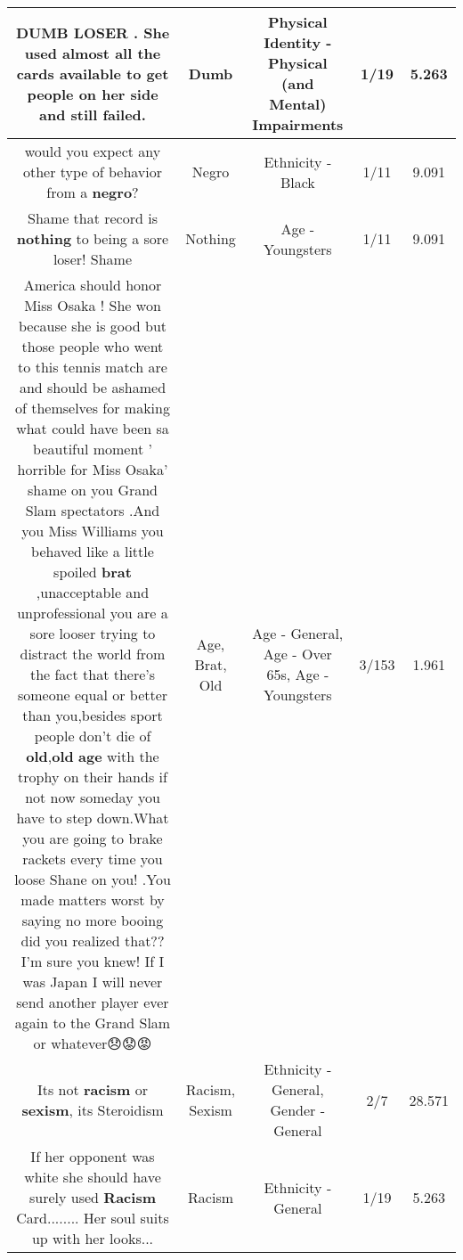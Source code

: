 \documentclass[11pt]{article}
\newlength\mylength
\begin{document}
\begin{center}
\begin{longtable}{|C{.65\mylength}|C{.30\mylength}|C{.12\mylength}|C{.12\mylength}|C{.12\mylength}|}
  \small DUMB LOSER . She used almost all the cards available to get people on her side and still failed.\normalsize   & Dumb & Physical Identity - Physical (and Mental) Impairments & 1/19 & 5.263 \\  \hline
  \small would you expect any other type of behavior from a \textbf{negro}?\normalsize   & Negro & Ethnicity - Black & 1/11 & 9.091 \\  \hline
  \small Shame that record is \textbf{nothing} to being a sore loser! Shame\normalsize   & Nothing & Age - Youngsters & 1/11 & 9.091 \\  \hline
  \small America should honor Miss Osaka ! She won because she is good but those people who went to this tennis match are and should be ashamed of themselves for making what could have been sa beautiful moment ' horrible for Miss Osaka' shame on you Grand Slam spectators .And you Miss Williams you behaved like a little spoiled \textbf{brat} ,unacceptable and unprofessional you are a sore looser trying to distract the world from the fact that there's someone equal or better than you,besides sport people don't die of \textbf{old},\textbf{old} \textbf{age} with the trophy on their hands if not now someday you have to step down.What you are going to brake rackets every time you loose Shane on you! .You made matters worst by saying no more booing did you realized that?? I'm sure you knew! If I was Japan I will never send another player ever again to the Grand Slam or whatever😞😟😡\normalsize   & Age, Brat, Old & Age - General, Age - Over 65s, Age - Youngsters & 3/153 & 1.961 \\  \hline
  \small Its not \textbf{racism} or \textbf{sexism}, its Steroidism\normalsize   & Racism, Sexism & Ethnicity - General, Gender - General & 2/7 & 28.571 \\  \hline
  \small If her opponent was white she should have surely used \textbf{Racism} Card........ Her soul suits up with her looks...\normalsize   & Racism & Ethnicity - General & 1/19 & 5.263 \\  \hline

\end{longtable}
\end{center}
\end{document}
